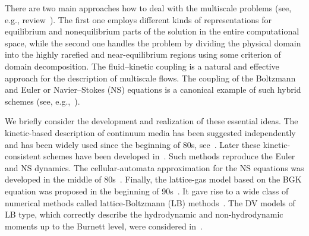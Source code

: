 \documentclass{elsarticle} %
\begin{document}
There are two main approaches how to deal with the multiscale problems (see, e.g., review~\cite{Dimarco2014}).
The first one employs different kinds of representations for equilibrium and nonequilibrium parts of the solution
in the entire computational space, while the second one handles the problem by dividing the physical domain
into the highly rarefied and near-equilibrium regions using some criterion of domain decomposition.
The fluid--kinetic coupling is a natural and effective approach for the description of multiscale flows.
The coupling of the Boltzmann and Euler or Navier--Stokes (NS) equations
is a canonical example of such hybrid schemes (see, e.g.,~\cite{Bourgat1996, Tallec1997}).

We briefly consider the development and realization of these essential ideas.
The kinetic-based description of continuum media has been suggested independently and has been widely used since the beginning of 80s,
see~\cite{Potkin1975, Pullin1980, Reitz1981, Aristov1983}. Later these kinetic-consistent schemes have been developed
in~\cite{Elizarova1985, Deshpande1986, Prendergast1993, Chou1997, Ohwada2004Xu, Ohwada2004Kobayashi, Ohwada2006}.
Such methods reproduce the Euler and NS dynamics.
The cellular-automata approximation for the NS equations was developed in the middle of 80s~\cite{Frisch1986}.
Finally, the lattice-gas model based on the BGK equation was proposed in the beginning of 90s~\cite{Qian1992}.
It gave rise to a wide class of numerical methods called lattice-Boltzmann (LB) methods~\cite{Higuera1989,Benzi1992,Succi2001}.
The DV models of LB type, which correctly describe the hydrodynamic and non-hydrodynamic moments
up to the Burnett level, were considered in~\cite{Xu2018, Xu2019}.
\end{document}
